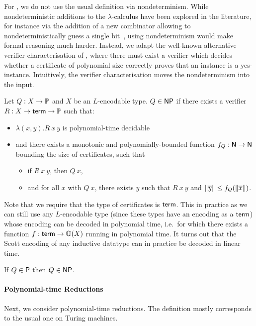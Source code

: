 For \NP{}, we do not use the usual definition via nondeterminism. While nondeterministic additions to the $\lambda$-calculus have been explored in the literature, for instance via the addition of a new combinator allowing to nondeterministically guess a single bit~\cite{kutzner:nondet_lambda}, using nondeterminism would make formal reasoning much harder.
Instead, we adapt the well-known alternative verifier characterisation of \NP{}, where there must exist a verifier which decides whether a certificate of polynomial size correctly proves that an instance is a yes-instance. Intuitively, the verifier characterisation moves the nondeterminism into the input.
\begin{definition}[\NP{}][inNP]
  Let $Q : X \rightarrow \mathbb{P}$ and $X$ be an $L$-encodable type. $Q \in \normalfont{\textsf{NP}{}}$ if there exists a verifier $R : X \rightarrow \textsf{term} \rightarrow \mathbb{P}$ such that: 
  \begin{itemize}
    \item $\lambda (x, y). R~x~y$ is polynomial-time decidable 
    \item and there exists a monotonic and polynomially-bounded function $f_Q : \mathsf{N} \rightarrow \mathsf{N}$ bounding the size of certificates, such that
      \begin{itemize}
        \item if $R~x~y$, then $Q~x$, 
        \item and for all $x$ with $Q~x$, there exists $y$ such that $R~x~y$ and $\left\lVert\overline{y}\right\rVert \le f_Q(\left\lVert\overline{x}\right\rVert)$.
      \end{itemize}
  \end{itemize}
\end{definition}

Note that we require that the type of certificates is $\textsf{term}$. This  in practice as we can still use any $L$-encodable type (since these types have an encoding as a $\textsf{term}$) whose encoding can be decoded in polynomial time, i.e.\ for which there exists a function $f : \textsf{term} \rightarrow \mathbb{O}{(X)}$ running in polynomial time. It turns out that the Scott encoding of any inductive datatype can in practice be decoded in linear time.

\begin{fact}
  If $Q \in \normalfont{\textsf{P}{}}$ then $Q \in \textsf{NP}{}$. 
\end{fact}

\paragraph{Polynomial-time Reductions}
Next, we consider polynomial-time reductions. The definition mostly corresponds to the usual one on Turing machines. 

